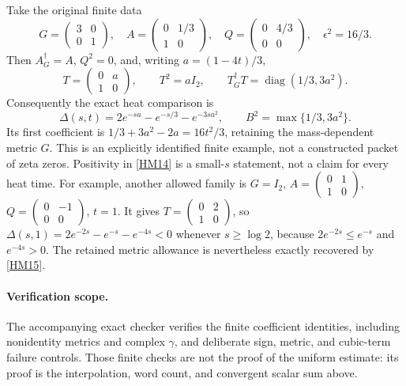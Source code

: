 \documentclass[11pt]{article}
\newcommand{\adj}{\dagger_G}
\begin{document}
Take the original finite data
\begin{equation}
 G=\begin{pmatrix}3&0\\0&1\end{pmatrix},\quad
 A=\begin{pmatrix}0&1/3\\1&0\end{pmatrix},\quad
 Q=\begin{pmatrix}0&4/3\\0&0\end{pmatrix},\quad
 \epsilon^2=16/3.
 \tag{HM18}\label{HM18}
\end{equation}
Then \(A^\adj=A\), \(Q^2=0\), and, writing \(a=(1-4t)/3\),
\[
 T=\begin{pmatrix}0&a\\1&0\end{pmatrix},\qquad
 T^2=aI_2,\qquad T^\adj T=\operatorname{diag}(1/3,3a^2).
\]
Consequently the exact heat comparison is
\begin{equation}
 \Delta(s,t)=2e^{-sa}-e^{-s/3}-e^{-3sa^2},\qquad
 B^2=\max\{1/3,3a^2\}.
 \tag{HM19}\label{HM19}
\end{equation}
Its first coefficient is
\(1/3+3a^2-2a=16t^2/3\), retaining the mass-dependent metric \(G\).
This is an explicitly identified finite example, not a constructed packet
of zeta zeros. Positivity in \eqref{HM14} is a small-\(s\) statement, not
a claim for every heat time. For example, another allowed family is
\(G=I_2\), \(A=\left(\begin{smallmatrix}0&1\\1&0\end{smallmatrix}\right)\),
\(Q=\left(\begin{smallmatrix}0&-1\\0&0\end{smallmatrix}\right)\), \(t=1\).
It gives \(T=\left(\begin{smallmatrix}0&2\\1&0\end{smallmatrix}\right)\),
so \(\Delta(s,1)=2e^{-2s}-e^{-s}-e^{-4s}<0\) whenever \(s\ge\log 2\),
because \(2e^{-2s}\le e^{-s}\) and \(e^{-4s}>0\).
The retained metric allowance is nevertheless exactly recovered by
\eqref{HM15}.

\paragraph{Verification scope.}
The accompanying exact checker verifies the finite coefficient identities,
including nonidentity metrics and complex \(\gamma\), and deliberate
sign, metric, and cubic-term failure controls. Those finite checks are
not the proof of the uniform estimate: its proof is the interpolation,
word count, and convergent scalar sum above.
\end{document}
